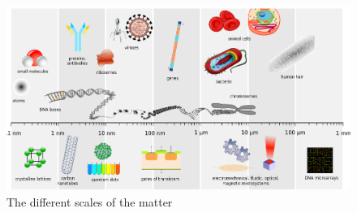 \documentclass[main.tex]{subfiles}
\begin{document}
 


\begin{figure}[h] %
\includegraphics[width=\linewidth,scale=0.5]{./chapter1/figure1-4}
\caption{The different scales of the matter}
\end{figure}
\sloppy
\end{document}
